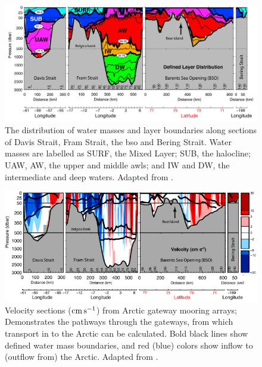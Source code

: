 \documentclass[10pt,a4paper]{article}
\begin{document}
\begin{figure}
	\centering
	\includegraphics[width=\linewidth]{Tsubouchi2012Gateways}
	\caption[Adapted from \cite{tsubouchi2012arctic}]{The distribution of water masses and
		layer boundaries along sections of Davis Strait, Fram Strait, the \gls{bso} and
		Bering Strait. Water masses are labelled as SURF, the Mixed Layer; SUB, the halocline;
		UAW, AW, the upper and middle \glspl{awl}; and IW and DW, the intermediate and deep
		waters.  Adapted from \cite{tsubouchi2012arctic}.}
	\label{fig:Tsubouchi2012Gateways}
\end{figure}

\begin{figure}
	\centering
	\includegraphics[width=\linewidth]{Tsubouchi2012Transport}
	\caption[Adapted from \cite{tsubouchi2012arctic}]{Velocity
		sections (${\rm cm} \, {\rm s}^{-1}$) from Arctic gateway mooring arrays;
		Demonstrates the pathways through the gateways, from which transport 
		in to the Arctic can be calculated.
		Bold black lines show defined water mass boundaries, and red (blue) colors show inflow
		to (outflow from) the Arctic.  Adapted from \cite{tsubouchi2012arctic}.}
	\label{fig:Tsubouchi2012Transport}
\end{figure}
\end{document}
